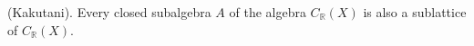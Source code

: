 (Kakutani). Every closed subalgebra $A$ of the algebra $C_{\mathbb{R}}(X)$ is also a sublattice of $C_{\mathbb{R}}(X)$.
